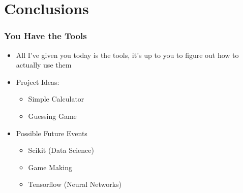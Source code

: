 \documentclass[aspectratio=169]{beamer}
\begin{document}
\section{Conclusions}
\begin{frame}
  \frametitle{You Have the Tools}
  \begin{itemize}
    \item All I've given you today is the tools, it's up to you to figure
          out how to actually use them
    \pause
    \item Project Ideas:
      \begin{itemize}
        \item Simple Calculator
        \item Guessing Game
      \end{itemize}
      \pause
    \item Possible Future Events
      \begin{itemize}
        \item Scikit (Data Science)
        \item Game Making
        \item Tensorflow (Neural Networks)
      \end{itemize}
  \end{itemize}

  

\end{frame}
\end{document}
